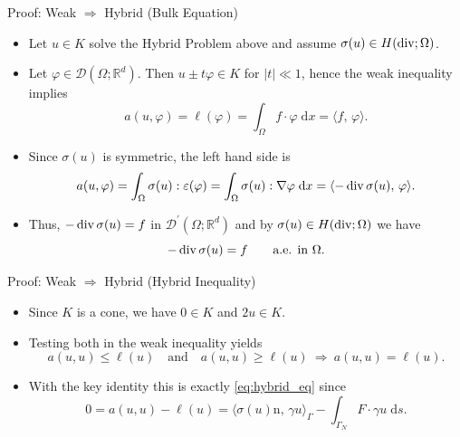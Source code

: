 \documentclass[10pt,aspectratio=169]{beamer}
\def\R{{\mathbb R}}
\def\cD{{\mathcal D}}
\def\d{{\mathrm{d}}}
\def\dx{{\d x}}
\def\ds{{\d s}}
\newcommand{\diver}{\operatornamewithlimits{div}}
\begin{document}
\begin{frame}{Proof: Weak $\Rightarrow$ Hybrid (Bulk Equation)}
	\begin{itemize}
		\item Let $u\in K$ solve the Hybrid Problem above and assume $\sigma(u)\in H(\diver;\Omega)$.
		\item Let $\varphi\in \cD(\Omega;\R^d)$. Then $u\pm t\varphi\in K$ for $|t|\ll 1$, hence the weak inequality implies
		      \begin{equation*}
			      a(u,\varphi)=\ell(\varphi)=\int_\Omega f\cdot \varphi\;\dx = \langle f,\,\varphi\rangle.
		      \end{equation*}
		\item Since $\sigma(u)$ is symmetric, the left hand side is
		      \begin{equation*}
			      a(u,\varphi) = \int_\Omega\sigma(u):\varepsilon(\varphi) = \int_\Omega\sigma(u):\nabla\varphi\;\dx = \langle -\diver\sigma(u),\,\varphi\rangle.
		      \end{equation*}
		\item Thus, $-\diver\sigma(u) = f$ in $\cD^\prime(\Omega;\R^d)$ and by $\sigma(u)\in H(\diver;\Omega)$ we have
		      \begin{equation*}
			      -\diver\sigma(u) = f\qquad \text{a.e. in }\Omega.
		      \end{equation*}
	\end{itemize}
\end{frame}

\begin{frame}{Proof: Weak $\Rightarrow$ Hybrid (Hybrid Inequality)}
	\begin{itemize}
		\item Since $K$ is a cone, we have $0\in K$ and $2u\in K$.
		\item Testing both in the weak inequality yields
		      \begin{equation*}
			      a(u,u)\le \ell(u)\quad\text{and}\quad a(u,u)\ge \ell(u)
			      \ \Rightarrow\ a(u,u)=\ell(u).
		      \end{equation*}
		\item With the key identity this is exactly \eqref{eq:hybrid_eq} since
		      \begin{equation*}
			      0 = a(u,u)-\ell(u) = \langle\sigma(u)\mathrm{n},\,\gamma u\rangle_\Gamma -\int_{\Gamma_N}F\cdot\gamma u\;\ds.
		      \end{equation*}
	\end{itemize}
\end{frame}
\end{document}
